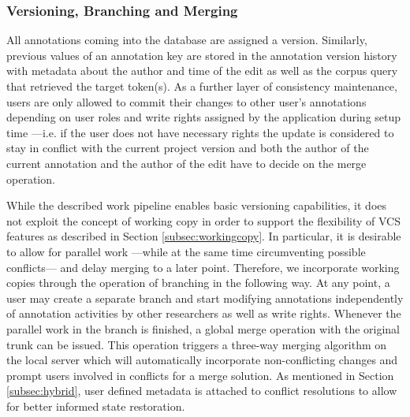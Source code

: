\documentclass{sig-alternate}
\begin{document}

\subsubsection{Versioning, Branching and Merging}\label{subsec:dbversion}

All annotations coming into the database are assigned a version. Similarly, previous values
of an annotation key are stored in the annotation version history with metadata about the author
and time of the edit as well as the corpus query that retrieved the target token(s).
As a further layer of consistency maintenance, users are only allowed to commit their changes
to other user's annotations depending on user roles and write rights assigned by the application
during setup time ---i.e. if the user does not have necessary rights the update is
considered to stay in conflict with the current project version and both the author of the
current annotation and the author of the edit have to decide on the merge operation.

While the described work pipeline enables basic versioning capabilities, it does not exploit
the concept of working copy in order to support the flexibility of VCS features as described in
Section \ref{subsec:workingcopy}. In particular, it is desirable to allow for parallel
work ---while at the same time circumventing possible conflicts--- and delay merging to a later
point. 
Therefore, we incorporate working copies through the operation of branching in the following way.
At any point, a user may create a separate branch and start modifying annotations independently of
annotation activities by other researchers as well as write rights. Whenever the parallel work in
the branch is finished, a global merge operation with the original trunk can be issued.
This operation triggers a three-way merging algorithm on the local server which will
automatically incorporate non-conflicting changes and prompt users involved in conflicts for
a merge solution. As mentioned in Section \ref{subsec:hybrid}, user defined metadata is attached
to conflict resolutions to allow for better informed state restoration.
\end{document}
